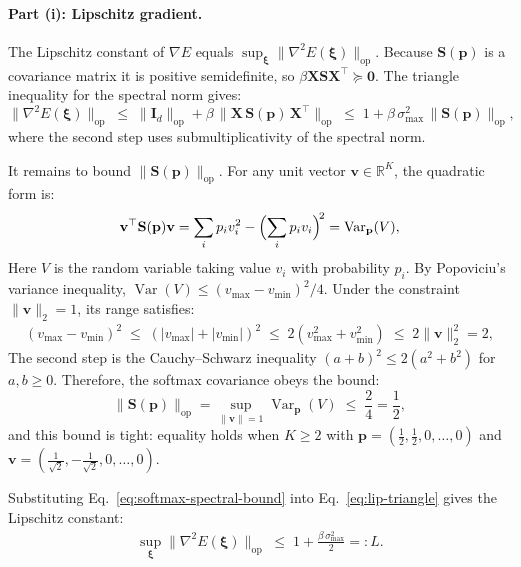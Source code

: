 \paragraph{Part (i): Lipschitz gradient.}
The Lipschitz constant of $\nabla E$ equals $\sup_{\boldsymbol{\xi}}\|\nabla^{2}E(\boldsymbol{\xi})\|_{\mathrm{op}}$. Because $\mathbf{S}(\mathbf{p})$ is a covariance matrix it is positive semidefinite, so $\beta\mathbf{X}\mathbf{S}\mathbf{X}^{\top}\succeq\mathbf{0}$. The triangle inequality for the spectral norm gives:
\begin{equation}\label{eq:lip-triangle}
    \|\nabla^{2}E(\boldsymbol{\xi})\|_{\mathrm{op}}
    \;\le\; \|\mathbf{I}_{d}\|_{\mathrm{op}}
            + \beta\,\|\mathbf{X}\,\mathbf{S}(\mathbf{p})\,\mathbf{X}^{\top}\|_{\mathrm{op}}
    \;\le\; 1 + \beta\,\sigma_{\max}^{2}\,\|\mathbf{S}(\mathbf{p})\|_{\mathrm{op}},
\end{equation}
where the second step uses submultiplicativity of the spectral norm.

It remains to bound $\|\mathbf{S}(\mathbf{p})\|_{\mathrm{op}}$. For any unit vector $\mathbf{v}\in\mathbb{R}^K$, the quadratic form is:
\begin{align*}
\mathbf{v}^{\top}\mathbf{S}(\mathbf{p})\mathbf{v}
= \sum_{i}p_{i}v_{i}^{2} - \Bigl(\sum_{i}p_{i}v_{i}\Bigr)^{\!2}
= \operatorname{Var}_{\mathbf{p}}(V),
\end{align*}
Here $V$ is the random variable taking value $v_i$ with probability $p_i$. By Popoviciu's variance inequality, $\operatorname{Var}(V)\le(v_{\max}-v_{\min})^{2}/4$. Under the constraint $\|\mathbf{v}\|_{2}=1$, its range satisfies:
\begin{align*}
(v_{\max}-v_{\min})^{2}
\;\le\; (|v_{\max}|+|v_{\min}|)^{2}
\;\le\; 2(v_{\max}^{2}+v_{\min}^{2})
\;\le\; 2\|\mathbf{v}\|_{2}^{2} = 2,
\end{align*}
The second step is the Cauchy--Schwarz inequality
$(a+b)^{2}\le 2(a^{2}+b^{2})$ for $a,b\ge 0$. Therefore, the softmax
covariance obeys the bound:
\begin{equation}\label{eq:softmax-spectral-bound}
    \|\mathbf{S}(\mathbf{p})\|_{\mathrm{op}}
    = \sup_{\|\mathbf{v}\|=1}\operatorname{Var}_{\mathbf{p}}(V)
    \;\le\; \frac{2}{4} = \frac{1}{2},
\end{equation}
and this bound is tight: equality holds when $K\ge 2$ with $\mathbf{p}=(\tfrac{1}{2},\tfrac{1}{2},0,\dots,0)$ and $\mathbf{v}=(\tfrac{1}{\sqrt{2}},-\tfrac{1}{\sqrt{2}},0,\dots,0)$.

Substituting Eq.~\eqref{eq:softmax-spectral-bound} into
Eq.~\eqref{eq:lip-triangle} gives the Lipschitz constant:
\begin{align*}
\sup_{\boldsymbol{\xi}}\|\nabla^{2}E(\boldsymbol{\xi})\|_{\mathrm{op}}
\;\le\; 1 + \frac{\beta\,\sigma_{\max}^{2}}{2}
=: L.
\end{align*}

